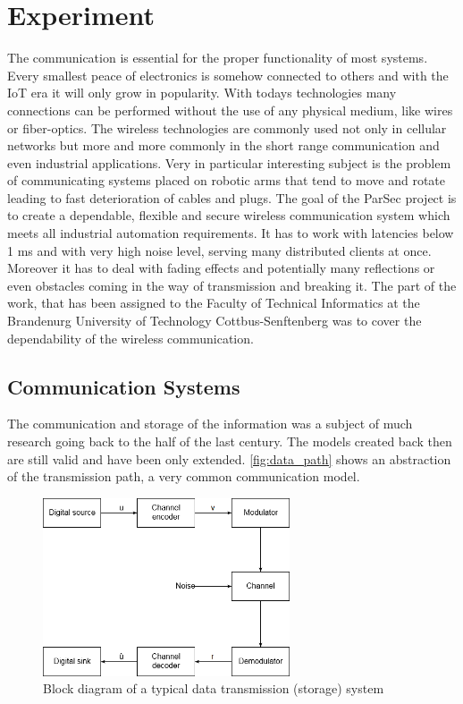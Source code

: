 \chapter{Experiment}

The communication is essential for the proper functionality of most systems. Every smallest peace of electronics is somehow connected to others and with the IoT era it will only grow in popularity. With todays technologies many connections can be performed without the use of any physical medium, like wires or fiber-optics. The wireless technologies are commonly used not only in cellular networks but more and more commonly in the short range communication and even industrial applications. Very in particular interesting subject is the problem of communicating systems placed on robotic arms that tend to move and rotate leading to fast deterioration of cables and plugs.
The goal of the ParSec project is to create a dependable, flexible and secure wireless communication system which meets all industrial automation requirements. It has to work with latencies below 1 ms and with very high noise level, serving many distributed clients at once. Moreover it has to deal with fading effects and potentially many reflections or even obstacles coming in the way of transmission and breaking it. The part of the work, that has been assigned to the Faculty of Technical Informatics at the Brandenurg University of Technology Cottbus-Senftenberg was to cover the dependability of the wireless communication. 

\section{Communication Systems}
The communication and storage of the information was a subject of much research going back to the half of the last century. The models created back then are still valid and have been only extended. \autoref{fig:data_path} shows an abstraction of the transmission path, a very common communication model.
\begin{figure}[H]
\centering
\includegraphics[width=0.65\textwidth]{figures/Data_transmission_path.png}
\caption{Block diagram of a typical data transmission (storage) system~\cite{book:LinCostello}}
\label{fig:data_path}
\end{figure}

